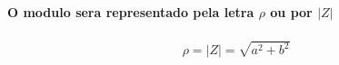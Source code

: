 \documentclass[12pt,twoside, a4paper, twocolumn]{article}
\newcommand{\drawvector} [9] [blue] {
    \draw[line width=1.5pt,#1,-stealth](axis cs: #2, #3)--(axis cs: #4, #5) node[anchor=south west]{$#6$};

    

\ifthenelse{\equal{#7}{true}}{
    \draw[line width=1pt,#1, dashed](axis cs: #4, #5)--(axis cs: #4, 0) node[anchor= north west]{$#8$};
    \draw[line width=1pt,#1, dashed](axis cs: #4, #5)--(axis cs: 0, #5) node[anchor=south east]{$#9$};
    }
    {}

}
\begin{document}
\paragraph*{O modulo sera representado pela letra $\rho$ ou por $| Z |$}

\begin{equation}
    \begin{aligned}
        \rho = | Z | = \sqrt{a^2 + b^2}
    \end{aligned}
\end{equation}



%  






\end{document}
